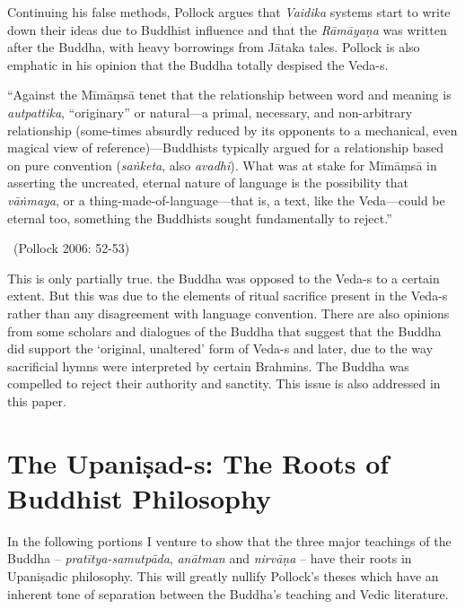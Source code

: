 Continuing his false methods, Pollock argues that \textit{Vaidika} systems start to write down their ideas due to Buddhist influence and that the \textit{Rāmāyaṇa} was written after the Buddha, with heavy borrowings from Jātaka tales. Pollock is also emphatic in his opinion that the Buddha totally despised the Veda-s.

\begin{myquote}
“Against the Mīmāṃsā tenet that the relationship between word and meaning is \textit{autpattika}, “originary” or natural—a primal, necessary, and non-arbitrary relationship (some-times absurdly reduced by its opponents to a mechanical, even magical view of reference)—Buddhists typically argued for a relationship based on pure convention (\textit{saṅketa}, also \textit{avadhi}). What was at stake for Mīmāṃsā in asserting the uncreated, eternal nature of language is the possibility that \textit{vāṅmaya}, or a thing-made-of-language—that is, a text, like the Veda—could be eternal too, something the Buddhists sought fundamentally to reject.” 

~\hfill (Pollock 2006: 52-53)
\end{myquote}

This is only partially true. the Buddha was opposed to the Veda-s to a certain extent. But this was due to the elements of ritual sacrifice present in the Veda-s rather than any disagreement with language convention. There are also opinions from some scholars and dialogues of the Buddha that suggest that the Buddha did support the ‘original, unaltered’ form of Veda-s and later, due to the way sacrificial hymns were interpreted by certain Brahmins. The Buddha was compelled to reject their authority and sanctity. This issue is also addressed in this paper.


\section*{The Upaniṣad-s: \hfill\break The Roots of Buddhist Philosophy}

In the following portions I venture to show that the three major teachings of the Buddha – \textit{pratītya-samutpāda}, \textit{anātman} and \textit{nirvāṇa} – have their roots in Upaniṣadic philosophy. This will greatly nullify Pollock’s theses which have an inherent tone of separation between the Buddha’s teaching and Vedic literature.

